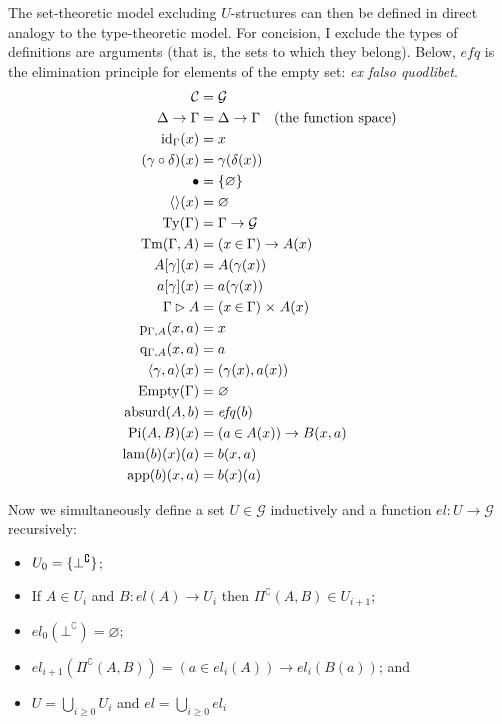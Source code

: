 \documentclass{article}
\renewcommand{\_}{\textrm{\textscale{.5}{\textunderscore}}}
\DeclarePairedDelimiter{\ctxt}{\langle}{\rangle}
\DeclarePairedDelimiter{\set}{\{}{\}}
\newcommand{\Tm}{\mathrm{Tm}}
\newcommand{\Ty}{\mathrm{Ty}}
\newcommand{\id}{\mathrm{id}}
\newcommand{\p}{\mathrm{p}}
\newcommand{\q}{\mathrm{q}}
\newcommand{\Empty}{\mathrm{Empty}}
\newcommand{\Absurd}{\mathrm{absurd}}
\newcommand{\pitype}{\mathrm{Pi}}
\newcommand{\lam}{\mathrm{lam}}
\newcommand{\app}{\mathrm{app}}
\newcommand{\code}[1]{#1^{\complement}}
\newcommand{\sFun}[3]{(#1 \mathbin{\in} #2) \mathrel{\to} #3}
\newcommand{\sPair}[3]{(#1 \mathbin{\in} #2) \mathrel{\times} #3}
\theoremstyle{definition}
\theoremstyle{plain}
\begin{document}
The set-theoretic model excluding $U$-structures can then be defined in direct analogy to the type-theoretic model.
For concision, I exclude the types of definitions are arguments (that is, the sets to which they belong).
Below, $\mathit{efq}$ is the elimination principle for elements of the empty set: \textit{ex falso quodlibet}.
%
\begin{align*}
    \mathcal{C} &= \mathcal{G} \\
    \Delta \to \Gamma &= \Delta \to \Gamma \quad \textrm{(the function space)} \\
    \id_\Gamma(x) &= x \\
    (\gamma \circ \delta)(x) &= \gamma(\delta(x)) \\
    \bullet &= \set{\varnothing} \\
    \ctxt{}(x) &= \varnothing \\
    \Ty(\Gamma) &= \Gamma \to \mathcal{G} \\
    \Tm(\Gamma, A) &= \sFun{x}{\Gamma}{A(x)} \\
    A[\gamma](x) &= A(\gamma(x)) \\
    a[\gamma](x) &= a(\gamma(x)) \\
    \Gamma \rhd A &= \sPair{x}{\Gamma}{A(x)} \\
    \p_{\Gamma, A}(x, a) &= x \\
    \q_{\Gamma, A}(x, a) &= a \\
    \ctxt{\gamma, a}(x) &= (\gamma(x), a(x)) \\
    \Empty(\Gamma) &= \varnothing \\
    \Absurd(A, b) &= \mathit{efq}(b) \\
    \pitype(A, B)(x) &= \sFun{a}{A(x)}{B(x, a)} \\
    \lam(b)(x)(a) &= b(x, a) \\
    \app(b)(x, a) &= b(x)(a)
\end{align*}

Now we simultaneously define a set $U \in \mathcal{G}$ inductively and a function $\mathit{el} : U \to \mathcal{G}$ recursively:

\begin{itemize}
    \item $U_0 = \set{\code{\bot}}$;
    \item If $A \in U_i$ and $B : \mathit{el}(A) \to U_i$ then $\code{\Pi}(A, B) \in U_{i+1}$;
    \item $\mathit{el}_0(\code{\bot}) = \varnothing$;
    \item $\mathit{el}_{i+1}(\code{\Pi}(A, B)) = \sFun{a}{\mathit{el}_i(A)}{\mathit{el}_i(B(a))}$; and
    \item $U = \bigcup_{i \geq 0} U_i$ and $\mathit{el} = \bigcup_{i \geq 0} \mathit{el}_i$
\end{itemize}
\end{document}
